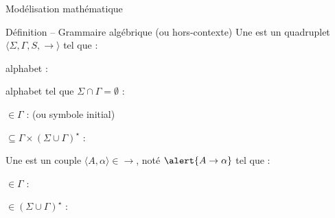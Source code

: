 
\begingroup

\begin{frame}{Modélisation mathématique}

  \begin{block}{Définition -- Grammaire algébrique (ou hors-contexte)}
    \vspace{2mm}
    Une  est un quadruplet \alert{$\langle \Sigma, \Gamma, S, \rightarrow \rangle$} tel que :
    \begin{description}[xxxx]
    \item[\alert{$\Sigma$}] alphabet : 
    \item[\alert{$\Gamma$}] alphabet tel que $\Sigma \cap \Gamma = \emptyset$ : 
    \item[\alert{$S$}] $\in \Gamma$ :  (ou symbole initial)
    \item[\alert{$\rightarrow$}] $\subseteq \Gamma \times (\Sigma \cup \Gamma)^\star$ : 
    \end{description}

    \vspace{3mm}
    Une  est un couple \alert{$\langle A, \alpha \rangle \in \rightarrow$}, noté $\alert{A \rightarrow \alpha}$ tel que :
    \begin{description}[xxxx]
    \item[\alert{$A$}] $\in \Gamma$ : 
    \item[\alert{$\alpha$}] $\in (\Sigma \cup \Gamma)^\star$ : 
    \end{description}
  \end{block}

\end{frame}

\endgroup
\endinput
